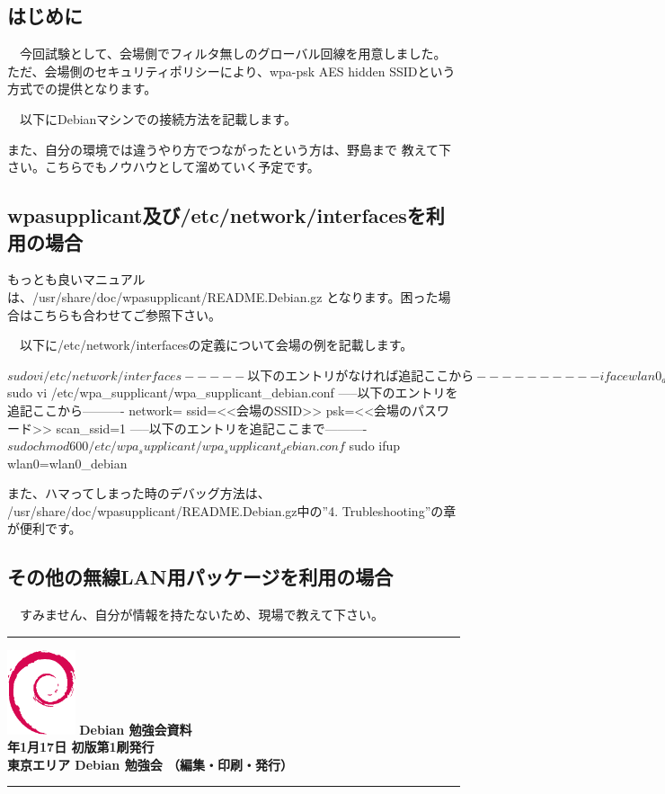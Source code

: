 \documentclass[mingoth,a4paper]{jsarticle}
\newcommand{\debmtgyear}{2015}
\newcommand{\debmtgmonth}{1}
\newcommand{\debmtgdate}{17}
\begin{document}
 \subsection{はじめに}

　今回試験として、会場側でフィルタ無しのグローバル回線を用意しました。
ただ、会場側のセキュリティポリシーにより、wpa-psk AES hidden SSIDという
方式での提供となります。

　以下にDebianマシンでの接続方法を記載します。

 また、自分の環境では違うやり方でつながったという方は、野島まで
教えて下さい。こちらでもノウハウとして溜めていく予定です。

 \subsection{wpasupplicant及び/etc/network/interfacesを利用の場合}

 もっとも良いマニュアルは、/usr/share/doc/wpasupplicant/README.Debian.gz
となります。困った場合はこちらも合わせてご参照下さい。

　以下に/etc/network/interfacesの定義について会場の例を記載します。

\begin{commandline}
$ sudo vi /etc/network/interfaces
-----以下のエントリがなければ追記ここから----------
iface wlan0_debian inet dhcp
     wpa-conf /etc/wpa_supplicant/wpa_supplicant_debian.conf
-----以下のエントリがなければ追記ここまで----------
$ sudo vi /etc/wpa_supplicant/wpa_supplicant_debian.conf
-----以下のエントリを追記ここから----------
network={
     ssid=<<会場のSSID>>
     psk=<<会場のパスワード>>
     scan_ssid=1
}
-----以下のエントリを追記ここまで----------
$ sudo chmod 600 /etc/wpa_supplicant/wpa_supplicant_debian.conf
$ sudo ifup wlan0=wlan0_debian
\end{commandline}

 また、ハマってしまった時のデバッグ方法は、
/usr/share/doc/wpasupplicant/README.Debian.gz中の''4. Trubleshooting''の章が便利です。

 \subsection{その他の無線LAN用パッケージを利用の場合}

　すみません、自分が情報を持たないため、現場で教えて下さい。

\cleartooddpage

\vspace*{15cm}
\hrule
\vspace{2mm}
\includegraphics[width=2cm]{image200502/openlogo-nd.eps}
\noindent \Large \bf Debian 勉強会資料\\
\noindent \normalfont \debmtgyear{}年\debmtgmonth{}月\debmtgdate{}日 \hspace{5mm}  初版第1刷発行\\
\noindent \normalfont 東京エリア Debian 勉強会 （編集・印刷・発行）\\
\hrule
\end{document}
